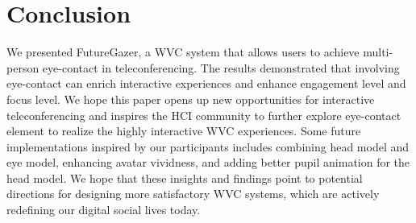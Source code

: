 




\section{Conclusion}

We presented FutureGazer, a WVC system that allows users to achieve multi-person eye-contact in teleconferencing. The results demonstrated that involving eye-contact can enrich interactive experiences and enhance engagement level and focus level. We hope this paper opens up new opportunities for interactive teleconferencing and inspires the HCI community to further explore eye-contact element to realize the highly interactive WVC experiences. Some future implementations inspired by our participants includes combining head model and eye model, enhancing avatar vividness, and adding better pupil animation for the head model. We hope that these insights and findings point to potential directions for designing more satisfactory WVC systems, which are actively redefining our digital social lives today. 
